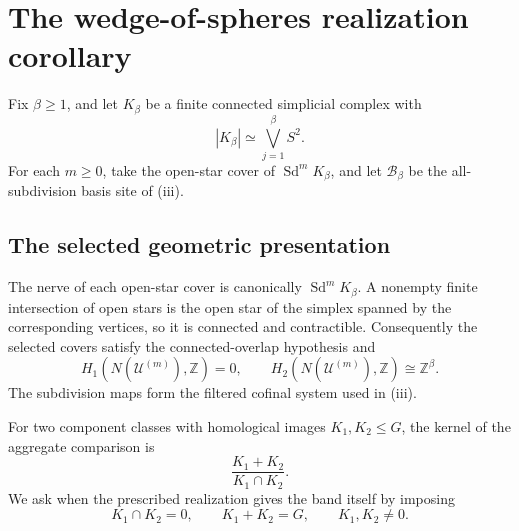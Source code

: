 \section{The wedge-of-spheres realization corollary}
\label{sec:wedge-application}

Fix \(\beta\ge1\), and let \(K_\beta\) be a finite connected simplicial
complex with
\[
 |K_\beta|\simeq\bigvee_{j=1}^{\beta}S^2.
\]
For each \(m\ge0\), take the open-star cover of
\(\operatorname{Sd}^mK_\beta\), and let \(\mathcal B_\beta\) be the
all-subdivision basis site of
(iii).

\subsection*{The selected geometric presentation}

The nerve of each open-star cover is canonically
\(\operatorname{Sd}^mK_\beta\).  A nonempty finite intersection of open
stars is the open star of the simplex spanned by the corresponding vertices,
so it is connected and contractible.  Consequently the selected covers
satisfy the connected-overlap hypothesis and
\begin{equation}\label{eq:wedge-homology}
 H_1(N(\mathcal U^{(m)}),\mathbb Z)=0,
 \qquad
 H_2(N(\mathcal U^{(m)}),\mathbb Z)\cong\mathbb Z^\beta.
\end{equation}
The subdivision maps form the filtered cofinal system used in
(iii).

For two component classes with homological images \(K_1,K_2\le G\), the
kernel of the aggregate comparison is
\[
 \frac{K_1+K_2}{K_1\cap K_2}.
\]
We ask when the prescribed realization gives the band itself by imposing
\begin{equation}\label{eq:complementary-images}
 K_1\cap K_2=0,
 \qquad K_1+K_2=G,
 \qquad K_1,K_2\ne0.
\end{equation}


